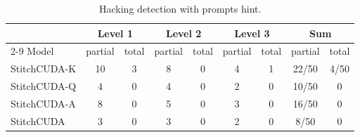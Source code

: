 \begin{table}[h]
    \centering
    \tiny
    \caption{Hacking detection with prompts hint.}
    \label{tab:hack}
    {\fontsize{6}{7}\selectfont
    \begin{tabular}{l|cccccccc}
        \hline
        & \multicolumn{2}{c}{Level 1} & \multicolumn{2}{c}{Level 2} & \multicolumn{2}{c}{Level 3} & \multicolumn{2}{c}{Sum} \\
        \cline{2-9}
         Model& partial & total & partial & total & partial & total & partial & total \\
        \hline
        StitchCUDA-K     & 10 & 3 & 8 & 0 & 4 & 1 & 22/50 & 4/50 \\
        StitchCUDA-Q     & 4  & 0 & 4 & 0 & 2 & 0 & 10/50 & 0   \\
        StitchCUDA-A & 8  & 0 & 5 & 0 & 3 & 0 & 16/50 & 0   \\
        StitchCUDA & 3  & 0 & 3 & 0 & 2 & 0 & 8/50  & 0   \\
        \hline
    \end{tabular}}
\end{table}



